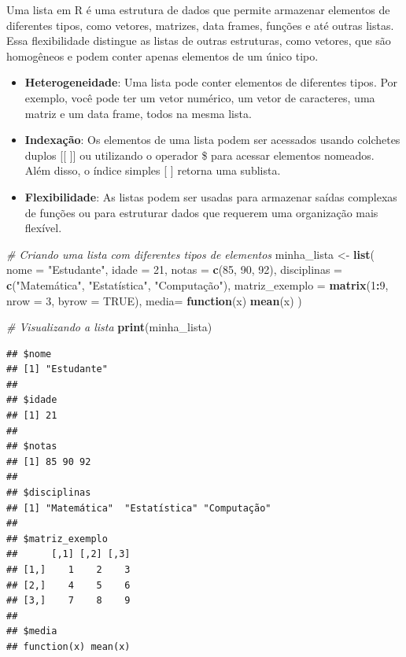 \documentclass[
]{book}
\newenvironment{Shaded}{\begin{snugshade}}{\end{snugshade}}
\newcommand{\AttributeTok}[1]{\textcolor[rgb]{0.13,0.29,0.53}{#1}}
\newcommand{\CommentTok}[1]{\textcolor[rgb]{0.56,0.35,0.01}{\textit{#1}}}
\newcommand{\ConstantTok}[1]{\textcolor[rgb]{0.56,0.35,0.01}{#1}}
\newcommand{\ControlFlowTok}[1]{\textcolor[rgb]{0.13,0.29,0.53}{\textbf{#1}}}
\newcommand{\DecValTok}[1]{\textcolor[rgb]{0.00,0.00,0.81}{#1}}
\newcommand{\FunctionTok}[1]{\textcolor[rgb]{0.13,0.29,0.53}{\textbf{#1}}}
\newcommand{\NormalTok}[1]{#1}
\newcommand{\OtherTok}[1]{\textcolor[rgb]{0.56,0.35,0.01}{#1}}
\newcommand{\SpecialCharTok}[1]{\textcolor[rgb]{0.81,0.36,0.00}{\textbf{#1}}}
\newcommand{\StringTok}[1]{\textcolor[rgb]{0.31,0.60,0.02}{#1}}
\begin{document}
Uma lista em R é uma estrutura de dados que permite armazenar elementos de diferentes tipos, como vetores, matrizes, data frames, funções e até outras listas. Essa flexibilidade distingue as listas de outras estruturas, como vetores, que são homogêneos e podem conter apenas elementos de um único tipo.

\begin{itemize}
\item
  \textbf{Heterogeneidade}: Uma lista pode conter elementos de diferentes tipos. Por exemplo, você pode ter um vetor numérico, um vetor de caracteres, uma matriz e um data frame, todos na mesma lista.
\item
  \textbf{Indexação}: Os elementos de uma lista podem ser acessados usando colchetes duplos {[}{[} {]}{]} ou utilizando o operador \$ para acessar elementos nomeados. Além disso, o índice simples {[} {]} retorna uma sublista.
\item
  \textbf{Flexibilidade}: As listas podem ser usadas para armazenar saídas complexas de funções ou para estruturar dados que requerem uma organização mais flexível.
\end{itemize}

\begin{Shaded}
\begin{Highlighting}[]
\CommentTok{\# Criando uma lista com diferentes tipos de elementos}
\NormalTok{minha\_lista }\OtherTok{\textless{}{-}} \FunctionTok{list}\NormalTok{(}
  \AttributeTok{nome =} \StringTok{"Estudante"}\NormalTok{,}
  \AttributeTok{idade =} \DecValTok{21}\NormalTok{,}
  \AttributeTok{notas =} \FunctionTok{c}\NormalTok{(}\DecValTok{85}\NormalTok{, }\DecValTok{90}\NormalTok{, }\DecValTok{92}\NormalTok{),}
  \AttributeTok{disciplinas =} \FunctionTok{c}\NormalTok{(}\StringTok{"Matemática"}\NormalTok{, }\StringTok{"Estatística"}\NormalTok{, }\StringTok{"Computação"}\NormalTok{),}
  \AttributeTok{matriz\_exemplo =} \FunctionTok{matrix}\NormalTok{(}\DecValTok{1}\SpecialCharTok{:}\DecValTok{9}\NormalTok{, }\AttributeTok{nrow =} \DecValTok{3}\NormalTok{, }\AttributeTok{byrow =} \ConstantTok{TRUE}\NormalTok{),}
  \AttributeTok{media=} \ControlFlowTok{function}\NormalTok{(x) }\FunctionTok{mean}\NormalTok{(x)}
\NormalTok{)}

\CommentTok{\# Visualizando a lista}
\FunctionTok{print}\NormalTok{(minha\_lista)}
\end{Highlighting}
\end{Shaded}

\begin{verbatim}
## $nome
## [1] "Estudante"
## 
## $idade
## [1] 21
## 
## $notas
## [1] 85 90 92
## 
## $disciplinas
## [1] "Matemática"  "Estatística" "Computação" 
## 
## $matriz_exemplo
##      [,1] [,2] [,3]
## [1,]    1    2    3
## [2,]    4    5    6
## [3,]    7    8    9
## 
## $media
## function(x) mean(x)
\end{verbatim}
\end{document}
